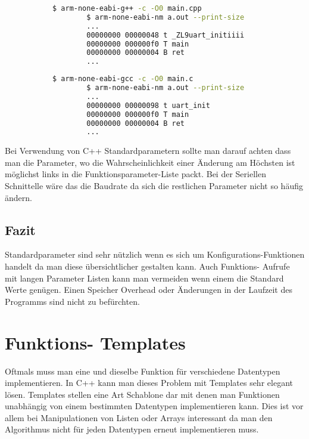 \documentclass[MES,Master,ngerman]{twbook}%
\begin{document}
\begin{figure}[!htb]
	\begin{subfigure}[b]{0.5\textwidth}
		\begin{lstlisting}[gobble=6, title={Analyse C++}, language=bash, numbers=none]
		$ arm-none-eabi-g++ -c -O0 main.cpp
		$ arm-none-eabi-nm a.out --print-size
		...
		00000000 00000048 t _ZL9uart_initiiii
		00000000 000000f0 T main
		00000000 00000004 B ret
		...
		\end{lstlisting}
	\end{subfigure}
	\begin{subfigure}[b]{0.5\textwidth}
		\begin{lstlisting}[gobble=6, title={Analyse C}, language=bash, numbers=none]
		$ arm-none-eabi-gcc -c -O0 main.c
		$ arm-none-eabi-nm a.out --print-size
		...
		00000000 00000098 t uart_init
		00000000 000000f0 T main
		00000000 00000004 B ret
		...
		\end{lstlisting}
	\end{subfigure}
\end{figure}
Bei Verwendung von C++ Standardparametern sollte man darauf achten dass man die Parameter, wo die Wahrscheinlichkeit einer Änderung am Höchsten ist möglichst links in die Funktionsparameter-Liste packt. Bei der Seriellen Schnittelle wäre das die Baudrate da sich die restlichen Parameter nicht so häufig ändern.  

\subsection{Fazit}
Standardparameter sind sehr nützlich wenn es sich um Konfigurations-Funktionen handelt da man diese übersichtlicher gestalten kann. Auch Funktions- Aufrufe mit langen Parameter Listen kann man vermeiden wenn einem die Standard Werte genügen. Einen Speicher Overhead oder Änderungen in der Laufzeit des Programms sind nicht zu befürchten.

\newpage

\section{Funktions- Templates}
Oftmals muss man eine und dieselbe Funktion für verschiedene Datentypen implementieren. In C++ kann man dieses Problem mit Templates sehr elegant lösen. Templates stellen eine Art Schablone dar mit denen man Funktionen unabhängig von einem bestimmten Datentypen implementieren kann. Dies ist vor allem bei Manipulationen von Listen oder Arrays interessant da man den Algorithmus nicht für jeden Datentypen erneut implementieren muss.
\end{document}
